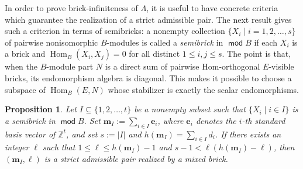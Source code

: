\documentclass[a4,12pt]{amsart}
\numberwithin{equation}{section} %
\def\Hom{\operatorname{Hom}} %
\def\mod{\operatorname{\mathsf{mod}}}
\newtheorem{proposition}[theorem]{Proposition} %
\theoremstyle{definition} %
\begin{document}
In order to prove brick-infiniteness of $\Lambda$, it is useful to have concrete criteria which guarantee the realization of a strict admissible pair. The next result gives such a criterion in terms of semibricks: a nonempty collection $\{X_i\mid i= 1,2,\ldots,s\}$ of pairwise nonisomorphic $B$-modules is called a \emph{semibrick} in $\mod B$ if each $X_i$ is a brick and $\Hom_B(X_i,X_j)=0$ for all distinct $1\le i,j\le s$. The point is that, when the $B$-module part $N$ is a direct sum of pairwise Hom-orthogonal $E$-visible bricks, its endomorphism algebra is diagonal. This makes it possible to choose a subspace of $\Hom_B(E,N)$ whose stabilizer is exactly the scalar endomorphisms.

\begin{proposition}\label{prop:semibrick-strict}
Let $I\subseteq\{1,2,\ldots,t\}$ be a nonempty subset such that $\{X_i\mid i\in I\}$ is a semibrick in $\mod B$. Set $\mathbf{m}_I:=\sum_{i\in I}\mathbf{e}_i$, where $\mathbf{e}_i$ denotes the $i$-th standard basis vector of $\mathbb{Z}^t$, and set $s:=|I|$ and $h(\mathbf{m}_I)=\sum_{i\in I}d_i$.
If there exists an integer $\ell$ such that $1\leq\ell\leq h(\mathbf{m}_I)-1$ and $s-1<\ell(h(\mathbf{m}_I)-\ell)$, then $(\mathbf{m}_I,\ell)$ is a strict admissible pair realized by a mixed brick. 
\end{proposition}
\end{document}
